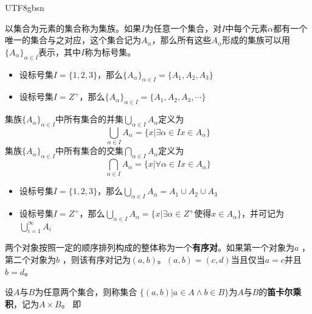 \documentclass{beamer}
\begin{document}
\begin{CJK*}{UTF8}{gbsn}
\begin{frame}
    \begin{Def}  
    以集合为元素的集合称为集族。如果$I$为任意一个集合，对$I$中每个元素$\alpha$都有一个唯一的集合与之对应，这个集合记为$A_{\alpha}$，那么所有这些$A_{\alpha}$形成的集族可以用$\{A_{\alpha}\}_{\alpha \in I}$表示，其中$I$称为标号集。
  \end{Def}
  \begin{Ex}
    \begin{itemize}
    \item 设标号集$I=\{1,2,3\}$，那么$\{A_{\alpha}\}_{\alpha \in I}=\{A_1,A_2,A_3\}$
    \item 设标号集$I=Z^+$，那么$\{A_{\alpha}\}_{\alpha \in I}=\{A_1,A_2,A_3,\cdots\}$
    \end{itemize}
  \end{Ex}
\end{frame}
\begin{frame}
  \begin{Def}
    集族$\{A_{\alpha}\}_{\alpha \in I}$中所有集合的并集$\bigcup_{\alpha \in I}A_{\alpha}$定义为
\[ \bigcup_{\alpha \in I}A_{\alpha} = \{x|\exists \alpha \in I x \in A_{\alpha}\}\]
    集族$\{A_{\alpha}\}_{\alpha \in I}$中所有集合的交集$\bigcap_{\alpha \in I}A_{\alpha}$定义为
\[ \bigcap_{\alpha \in I}A_{\alpha} = \{x|\forall \alpha \in I x \in A_{\alpha}\}\]
\end{Def}
  \begin{Ex}
    \begin{itemize}
    \item 设标号集$I=\{1,2,3\}$，那么$\bigcup_{\alpha \in I}A_{\alpha}=A_1\cup A_2 \cup A_3$
    \item 设标号集$I=Z^+$，那么$\bigcup_{\alpha \in I}A_{\alpha}=\{x|\exists \alpha \in Z^+ \text{使得} x \in A_{\alpha}\}$，并可记为$\bigcup_{i=1}^{\infty}A_i$
    \end{itemize}
  \end{Ex}
\end{frame}
\begin{frame}
    \begin{Def}
    两个对象按照一定的顺序排列构成的整体称为一个{\bfseries 有序对}。如果第一个对象为$a$ ，第二个对象为$b$ ，则该有序对记为$(a,b)$。$(a,b)=(c,d)$当且仅当$a=c$并且$b=d$。
  \end{Def}
  \begin{Def}\justifying\let\raggedright\justifying
    设$A$与$B$为任意两个集合，则称集合 $\{(a,b)|a\in A \land b \in B\}$为$A$与$B$的{\bfseries 笛卡尔乘积}，记为$A \times B$。
即
\begin{equation*}

\end{equation*}
\end{Def}
\end{frame}
\end{CJK*}
\end{document}
